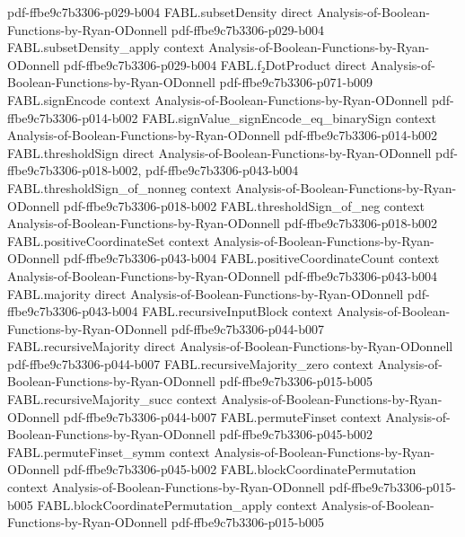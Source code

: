 \begin{theorem}
  {pdf-ffbe9c7b3306-p029-b004}
\proofstep
  {FABL.subsetDensity}
  {direct}
  {Analysis-of-Boolean-Functions-by-Ryan-ODonnell}
  {pdf-ffbe9c7b3306-p029-b004}
\proofstep
  {FABL.subsetDensity_apply}
  {context}
  {Analysis-of-Boolean-Functions-by-Ryan-ODonnell}
  {pdf-ffbe9c7b3306-p029-b004}
\proofstep
  {FABL.f₂DotProduct}
  {direct}
  {Analysis-of-Boolean-Functions-by-Ryan-ODonnell}
  {pdf-ffbe9c7b3306-p071-b009}
\proofstep
  {FABL.signEncode}
  {context}
  {Analysis-of-Boolean-Functions-by-Ryan-ODonnell}
  {pdf-ffbe9c7b3306-p014-b002}
\proofstep
  {FABL.signValue_signEncode_eq_binarySign}
  {context}
  {Analysis-of-Boolean-Functions-by-Ryan-ODonnell}
  {pdf-ffbe9c7b3306-p014-b002}
\proofstep
  {FABL.thresholdSign}
  {direct}
  {Analysis-of-Boolean-Functions-by-Ryan-ODonnell}
  {pdf-ffbe9c7b3306-p018-b002,
    pdf-ffbe9c7b3306-p043-b004}
\proofstep
  {FABL.thresholdSign_of_nonneg}
  {context}
  {Analysis-of-Boolean-Functions-by-Ryan-ODonnell}
  {pdf-ffbe9c7b3306-p018-b002}
\proofstep
  {FABL.thresholdSign_of_neg}
  {context}
  {Analysis-of-Boolean-Functions-by-Ryan-ODonnell}
  {pdf-ffbe9c7b3306-p018-b002}
\proofstep
  {FABL.positiveCoordinateSet}
  {context}
  {Analysis-of-Boolean-Functions-by-Ryan-ODonnell}
  {pdf-ffbe9c7b3306-p043-b004}
\proofstep
  {FABL.positiveCoordinateCount}
  {context}
  {Analysis-of-Boolean-Functions-by-Ryan-ODonnell}
  {pdf-ffbe9c7b3306-p043-b004}
\proofstep
  {FABL.majority}
  {direct}
  {Analysis-of-Boolean-Functions-by-Ryan-ODonnell}
  {pdf-ffbe9c7b3306-p043-b004}
\proofstep
  {FABL.recursiveInputBlock}
  {context}
  {Analysis-of-Boolean-Functions-by-Ryan-ODonnell}
  {pdf-ffbe9c7b3306-p044-b007}
\proofstep
  {FABL.recursiveMajority}
  {direct}
  {Analysis-of-Boolean-Functions-by-Ryan-ODonnell}
  {pdf-ffbe9c7b3306-p044-b007}
\proofstep
  {FABL.recursiveMajority_zero}
  {context}
  {Analysis-of-Boolean-Functions-by-Ryan-ODonnell}
  {pdf-ffbe9c7b3306-p015-b005}
\proofstep
  {FABL.recursiveMajority_succ}
  {context}
  {Analysis-of-Boolean-Functions-by-Ryan-ODonnell}
  {pdf-ffbe9c7b3306-p044-b007}
\proofstep
  {FABL.permuteFinset}
  {context}
  {Analysis-of-Boolean-Functions-by-Ryan-ODonnell}
  {pdf-ffbe9c7b3306-p045-b002}
\proofstep
  {FABL.permuteFinset_symm}
  {context}
  {Analysis-of-Boolean-Functions-by-Ryan-ODonnell}
  {pdf-ffbe9c7b3306-p045-b002}
\proofstep
  {FABL.blockCoordinatePermutation}
  {context}
  {Analysis-of-Boolean-Functions-by-Ryan-ODonnell}
  {pdf-ffbe9c7b3306-p015-b005}
\proofstep
  {FABL.blockCoordinatePermutation_apply}
  {context}
  {Analysis-of-Boolean-Functions-by-Ryan-ODonnell}
  {pdf-ffbe9c7b3306-p015-b005}

\end{theorem}
